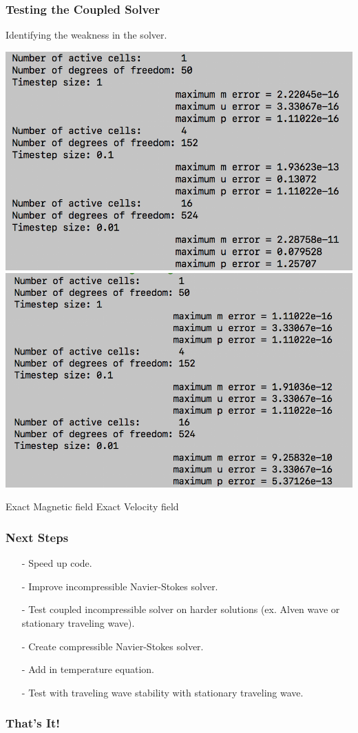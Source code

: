 \documentclass[mathserif]{beamer} %
\begin{document}
\begin{frame}
    \frametitle{Testing the Coupled Solver}

    Identifying the weakness in the solver.

    \pause

    \begin{center}
        \includegraphics[width=.45\textwidth]{exact_mag.png}
        \includegraphics[width=.45\textwidth]{exact_vel.png}
    \end{center}

      \hspace{.4cm}  Exact Magnetic field \hspace{1.8cm}  Exact Velocity field

      \vfill


\end{frame}
\begin{frame}
    \frametitle{Next Steps}
    \pause
    \begin{itemize}
        \item[-] Speed up code.
            \pause
        \item[-] Improve incompressible Navier-Stokes solver.
    \pause
\item[-] Test coupled incompressible solver on harder solutions (ex. Alven wave or stationary traveling wave).
    \pause
        \item[-] Create compressible Navier-Stokes solver.
    \pause
        \item[-] Add in temperature equation.
    \pause
        \item[-] Test with traveling wave stability with stationary traveling wave.
    \end{itemize}
\end{frame}

\begin{frame}
    \frametitle{That's It!}
\end{frame}



\end{document}
